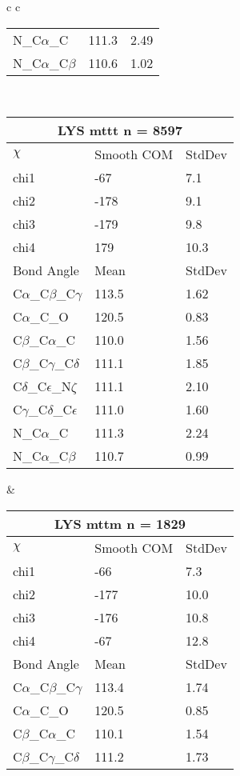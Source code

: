 \begin{longtable}{ c c }
\begin{tabular}{ l l l }
  N\_C$\alpha$\_C & 111.3 & 2.49\\
  N\_C$\alpha$\_C$\beta$ & 110.6 & 1.02\\
  \bottomrule
  \end{tabular}
  \\
  \begin{tabular}{ l l l }
  \toprule
  \multicolumn{3}{c}{LYS \textbf{mttt} n = 8597} \\ \toprule
  $\chi$       & Smooth COM & StdDev \\ \midrule
  chi1 & -67 & 7.1 \\ 
  chi2 & -178 & 9.1 \\ 
  chi3 & -179 & 9.8 \\ 
  chi4 & 179 & 10.3 \\ \midrule
  Bond Angle   & Mean     & StdDev \\ \midrule
  C$\alpha$\_C$\beta$\_C$\gamma$ & 113.5 & 1.62\\
  C$\alpha$\_C\_O & 120.5 & 0.83\\
  C$\beta$\_C$\alpha$\_C & 110.0 & 1.56\\
  C$\beta$\_C$\gamma$\_C$\delta$ & 111.1 & 1.85\\
  C$\delta$\_C$\epsilon$\_N$\zeta$ & 111.1 & 2.10\\
  C$\gamma$\_C$\delta$\_C$\epsilon$ & 111.0 & 1.60\\
  N\_C$\alpha$\_C & 111.3 & 2.24\\
  N\_C$\alpha$\_C$\beta$ & 110.7 & 0.99\\
  \bottomrule
  \end{tabular}
  &
  \begin{tabular}{ l l l }
  \toprule
  \multicolumn{3}{c}{LYS \textbf{mttm} n = 1829} \\ \toprule
  $\chi$       & Smooth COM & StdDev \\ \midrule
  chi1 & -66 & 7.3 \\ 
  chi2 & -177 & 10.0 \\ 
  chi3 & -176 & 10.8 \\ 
  chi4 & -67 & 12.8 \\ \midrule
  Bond Angle   & Mean     & StdDev \\ \midrule
  C$\alpha$\_C$\beta$\_C$\gamma$ & 113.4 & 1.74\\
  C$\alpha$\_C\_O & 120.5 & 0.85\\
  C$\beta$\_C$\alpha$\_C & 110.1 & 1.54\\
  C$\beta$\_C$\gamma$\_C$\delta$ & 111.2 & 1.73\\

\end{tabular}
\end{longtable}
